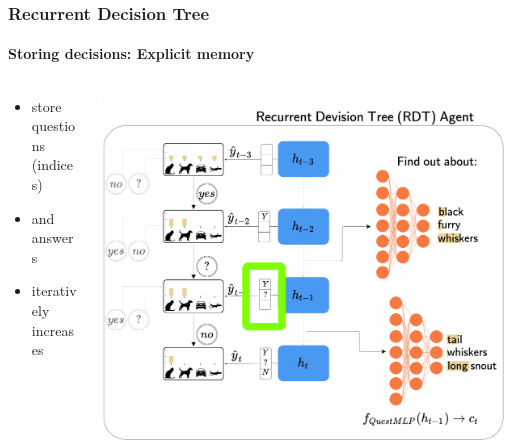 \documentclass[9pt]{beamer}
\begin{document}
\begin{frame}
\frametitle{Recurrent Decision Tree}
\framesubtitle{Storing decisions: Explicit memory}
\begin{columns}[T]
	\begin{column}{.5\textwidth}
		\begin{itemize}
			\item store questions (indices)
			\item and answers
			\item iteratively increases
		\end{itemize}
	\end{column}
	\begin{column}{.5\textwidth}
		\includegraphics[width=\textwidth]{images/urdtc_parts_memory.pdf}
	\end{column}
\end{columns}
\end{frame}
\end{document}
